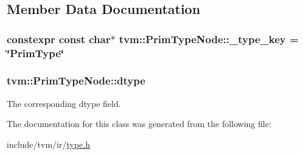 \subsection{Member Data Documentation}
\subsubsection[{\texorpdfstring{\+\_\+type\+\_\+key}{_type_key}}]{\setlength{\rightskip}{0pt plus 5cm}constexpr const char$\ast$ tvm\+::\+Prim\+Type\+Node\+::\+\_\+type\+\_\+key = \char`\"{}Prim\+Type\char`\"{}\hspace{0.3cm}{\ttfamily [static]}}\hypertarget{classtvm_1_1PrimTypeNode_a711129730780a378013cd8bf2e447a2b}{}\label{classtvm_1_1PrimTypeNode_a711129730780a378013cd8bf2e447a2b}
\subsubsection[{\texorpdfstring{dtype}{dtype}}]{ tvm\+::\+Prim\+Type\+Node\+::dtype}\hypertarget{classtvm_1_1PrimTypeNode_a3095121c58f824e258f2ac2f345ae7d1}{}\label{classtvm_1_1PrimTypeNode_a3095121c58f824e258f2ac2f345ae7d1}


The corresponding dtype field. 



The documentation for this class was generated from the following file\+:\begin{DoxyCompactItemize}
\item 
include/tvm/ir/\hyperlink{ir_2type_8h}{type.\+h}\end{DoxyCompactItemize}
